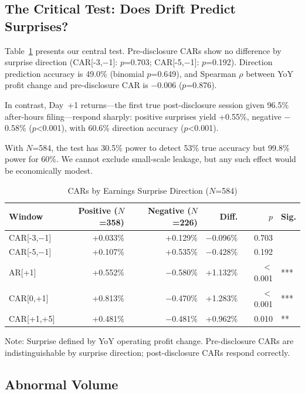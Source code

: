 \documentclass[review,authoryear]{elsarticle}
\begin{document}
\subsection{The Critical Test: Does Drift Predict Surprises?}

Table~\ref{tab:surprise} presents our central test. Pre-disclosure CARs show no difference by surprise direction (CAR[-3,$-$1]: $p$=0.703; CAR[-5,$-$1]: $p$=0.192). Direction prediction accuracy is 49.0\% (binomial $p$=0.649), and Spearman $\rho$ between YoY profit change and pre-disclosure CAR is $-$0.006 ($p$=0.876).

In contrast, Day~+1 returns---the first true post-disclosure session given 96.5\% after-hours filing---respond sharply: positive surprises yield +0.55\%, negative $-$0.58\% ($p$<0.001), with 60.6\% direction accuracy ($p$<0.001).

With $N$=584, the test has 30.5\% power to detect 53\% true accuracy but 99.8\% power for 60\%. We cannot exclude small-scale leakage, but any such effect would be economically modest.

\begin{table}[H]
\centering
\begin{threeparttable}
\caption{CARs by Earnings Surprise Direction ($N$=584)}
\label{tab:surprise}
\begin{tabular}{lrrrrl}
\toprule
Window & Positive ($N$=358) & Negative ($N$=226) & Diff. & $p$ & Sig. \\
\midrule
CAR[-3,$-$1] & +0.033\% & +0.129\% & $-$0.096\% & 0.703 & \\
CAR[-5,$-$1] & +0.107\% & +0.535\% & $-$0.428\% & 0.192 & \\
\midrule
AR[+1] & +0.552\% & $-$0.580\% & +1.132\% & $<$0.001 & *** \\
CAR[0,+1] & +0.813\% & $-$0.470\% & +1.283\% & $<$0.001 & *** \\
CAR[+1,+5] & +0.481\% & $-$0.481\% & +0.962\% & 0.010 & ** \\
\bottomrule
\end{tabular}
\begin{tablenotes}
\small
\item Note: Surprise defined by YoY operating profit change. Pre-disclosure CARs are indistinguishable by surprise direction; post-disclosure CARs respond correctly.
\end{tablenotes}
\end{threeparttable}
\end{table}

\subsection{Abnormal Volume}
\end{document}
